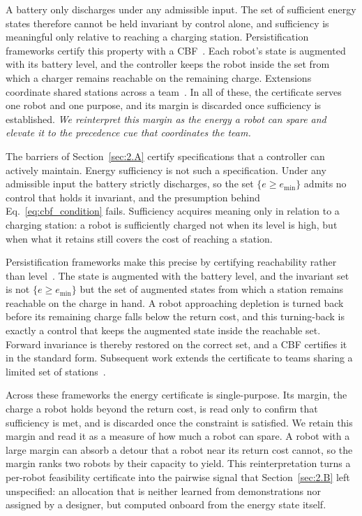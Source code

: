 A battery only discharges under any admissible input.
The set of sufficient energy states therefore cannot be held invariant by control alone, and sufficiency is meaningful only relative to reaching a charging station.
Persistification frameworks certify this property with a CBF~\cite{notomista2018persistification, notomista2020persistification}.
Each robot's state is augmented with its battery level, and the controller keeps the robot inside the set from which a charger remains reachable on the remaining charge.
Extensions coordinate shared stations across a team~\cite{fouad2022energy}.
In all of these, the certificate serves one robot and one purpose, and its margin is discarded once sufficiency is established.
\textit{We reinterpret this margin as the energy a robot can spare and elevate it to the precedence cue that coordinates the team.}

The barriers of Section~\ref{sec:2.A} certify specifications that a controller can actively maintain. 
Energy sufficiency is not such a specification. 
Under any admissible input the battery strictly discharges, so the set $\{e\geq e_{\min}\}$ admits no control that holds it invariant, and the presumption behind Eq.~\eqref{eq:cbf_condition} fails.
Sufficiency acquires meaning only in relation to a charging station: a robot is sufficiently charged not when its level is high, but when what it retains still covers the cost of reaching a station.

Persistification frameworks make this precise by certifying reachability rather than level~\cite{notomista2018persistification, notomista2020persistification}.
The state is augmented with the battery level, and the invariant set is not $\{e\geq e_{\min}\}$ but the set of augmented states from which a station remains reachable on the charge in hand. 
A robot approaching depletion is turned back before its remaining charge falls below the return cost, and this turning-back is exactly a control that keeps the augmented state inside the reachable set. 
Forward invariance is thereby restored on the correct set, and a CBF certifies it in the standard form. 
Subsequent work extends the certificate to teams sharing a limited set of stations~\cite{fouad2022energy}.

Across these frameworks the energy certificate is single-purpose.
Its margin, the charge a robot holds beyond the return cost, is read only to confirm that sufficiency is met, and is discarded once the constraint is satisfied.
We retain this margin and read it as a measure of how much a robot can spare. 
A robot with a large margin can absorb a detour that a robot near its return cost cannot, so the margin ranks two robots by their capacity to yield. 
This reinterpretation turns a per-robot feasibility certificate into the pairwise signal that Section~\ref{sec:2.B} left unspecified: an allocation that is neither learned from demonstrations nor assigned by a designer, but computed onboard from the energy state itself.